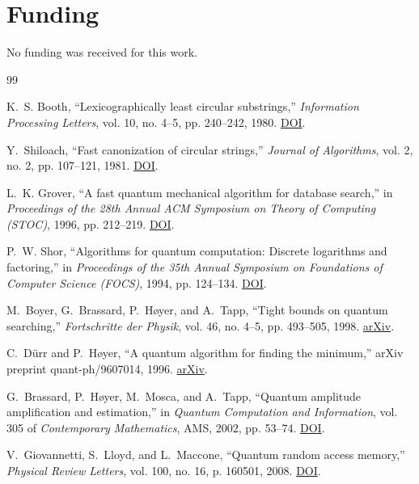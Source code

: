 \documentclass[11pt,letterpaper]{article}
\begin{document}
\section*{Funding}
No funding was received for this work.

\begin{thebibliography}{99}
\small
\raggedright
\setlength{\itemsep}{0.1em}
\setlength{\parsep}{0pt}

K.~S. Booth, ``Lexicographically least circular substrings,'' \emph{Information Processing Letters}, vol. 10, no. 4--5, pp. 240--242, 1980. \href{https://doi.org/10.1016/0020-0190(80)90149-0}{DOI}.

Y.~Shiloach, ``Fast canonization of circular strings,'' \emph{Journal of Algorithms}, vol. 2, no. 2, pp. 107--121, 1981. \href{https://doi.org/10.1016/0196-6774(81)90013-4}{DOI}.

L.~K. Grover, ``A fast quantum mechanical algorithm for database search,'' in \emph{Proceedings of the 28th Annual ACM Symposium on Theory of Computing (STOC)}, 1996, pp. 212--219. \href{https://doi.org/10.1145/237814.237866}{DOI}.

P.~W. Shor, ``Algorithms for quantum computation: Discrete logarithms and factoring,'' in \emph{Proceedings of the 35th Annual Symposium on Foundations of Computer Science (FOCS)}, 1994, pp. 124--134. \href{https://doi.org/10.1109/SFCS.1994.365700}{DOI}.

M.~Boyer, G.~Brassard, P.~H{\o}yer, and A.~Tapp, ``Tight bounds on quantum searching,'' \emph{Fortschritte der Physik}, vol. 46, no. 4--5, pp. 493--505, 1998. \href{https://arxiv.org/abs/quant-ph/9605034}{arXiv}.

C.~D{\"u}rr and P.~H{\o}yer, ``A quantum algorithm for finding the minimum,'' arXiv preprint quant-ph/9607014, 1996. \href{https://arxiv.org/abs/quant-ph/9607014}{arXiv}.

G.~Brassard, P.~H{\o}yer, M.~Mosca, and A.~Tapp, ``Quantum amplitude amplification and estimation,'' in \emph{Quantum Computation and Information}, vol. 305 of \emph{Contemporary Mathematics}, AMS, 2002, pp. 53--74. \href{https://doi.org/10.1090/conm/305/05215}{DOI}.

V.~Giovannetti, S.~Lloyd, and L.~Maccone, ``Quantum random access memory,'' \emph{Physical Review Letters}, vol. 100, no. 16, p. 160501, 2008. \href{https://doi.org/10.1103/PhysRevLett.100.160501}{DOI}.


\end{thebibliography}
\end{document}
